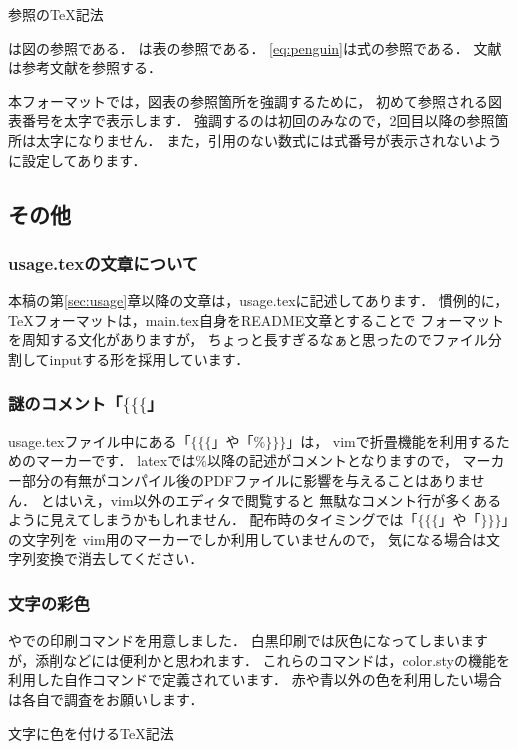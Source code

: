 \begin{lstbox}{参照のTeX記法}
\begin{minilst}
は図の参照である．
は表の参照である．
\eqref{eq:penguin}は式の参照である．
文献\Cite{penguin}は参考文献を参照する\cite{penguin}．
\end{minilst}
\end{lstbox}

本フォーマットでは，図表の参照箇所を強調するために，
初めて参照される図表番号を太字で表示します．
強調するのは初回のみなので，2回目以降の参照箇所は太字になりません．
また，引用のない数式には式番号が表示されないように設定してあります．

\subsection{その他}

\subsubsection{usage.texの文章について}
本稿の第\ref{sec:usage}章以降の文章は，usage.texに記述してあります．
慣例的に，TeXフォーマットは，main.tex自身をREADME文章とすることで
フォーマットを周知する文化がありますが，
ちょっと長すぎるなぁと思ったのでファイル分割してinputする形を採用しています．

\subsubsection{謎のコメント「$\{\{\{$」}
usage.texファイル中にある「$\{\{\{$」や「$\%\}\}\}$」は，
vimで折畳機能を利用するためのマーカーです．
latexでは$\%$以降の記述がコメントとなりますので，
マーカー部分の有無がコンパイル後のPDFファイルに影響を与えることはありません．
とはいえ，vim以外のエディタで閲覧すると
無駄なコメント行が多くあるように見えてしまうかもしれません．
配布時のタイミングでは「$\{\{\{$」や「$\}\}\}$」の文字列を
vim用のマーカーでしか利用していませんので，
気になる場合は文字列変換で消去してください．

\subsubsection{文字の彩色}
やでの印刷コマンドを用意しました．
白黒印刷では灰色になってしまいますが，添削などには便利かと思われます．
これらのコマンドは，color.styの機能を利用した自作コマンドで定義されています．
赤や青以外の色を利用したい場合は各自で調査をお願いします．
\begin{lstbox}{文字に色を付けるTeX記法}
\begin{minilst}
\end{minilst}
\end{lstbox}



